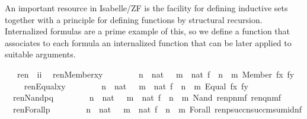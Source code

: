 An important resource in Isabelle/ZF is the facility for defining
inductive sets \cite{paulson2000fixedpoint,paulson1995set} together
with a principle for defining functions by structural recursion.
Internalized formulas are a prime example of this, so we define
a function  that associates to each formula an internalized
function that can be later applied to suitable arguments.
\begin{isabelle}
\isamarkuptrue%
\isamarkupfalse%
\ \ \ ren\ {\isacharcolon}{\isacharcolon}\ {\isachardoublequoteopen}i{\isacharequal}{\isachargreater}i{\isachardoublequoteclose}\isanewline
{}\isamarkupfalse%
\isanewline
\ \ {\isachardoublequoteopen}ren{\isacharparenleft}Member{\isacharparenleft}x{\isacharcomma}y{\isacharparenright}{\isacharparenright}\ {\isacharequal}\isanewline
\ \ \ \ \ \ {\isacharparenleft}{\isasymlambda}\ n\ {\isasymin}\ nat\ {\isachardot}\ {\isasymlambda}\ m\ {\isasymin}\ nat{\isachardot}\ {\isasymlambda}f\ {\isasymin}\ n\ {\isasymrightarrow}\ m{\isachardot}\ Member\ {\isacharparenleft}f{\isacharbackquote}x{\isacharcomma}\ f{\isacharbackquote}y{\isacharparenright}{\isacharparenright}{\isachardoublequoteclose}\isanewline
\ \ \isanewline
\ \ {\isachardoublequoteopen}ren{\isacharparenleft}Equal{\isacharparenleft}x{\isacharcomma}y{\isacharparenright}{\isacharparenright}\ {\isacharequal}\isanewline
\ \ \ \ \ \ {\isacharparenleft}{\isasymlambda}\ n\ {\isasymin}\ nat\ {\isachardot}\ {\isasymlambda}\ m\ {\isasymin}\ nat{\isachardot}\ {\isasymlambda}f\ {\isasymin}\ n\ {\isasymrightarrow}\ m{\isachardot}\ Equal\ {\isacharparenleft}f{\isacharbackquote}x{\isacharcomma}\ f{\isacharbackquote}y{\isacharparenright}{\isacharparenright}{\isachardoublequoteclose}\isanewline
\ \ \isanewline
\ \ {\isachardoublequoteopen}ren{\isacharparenleft}Nand{\isacharparenleft}p{\isacharcomma}q{\isacharparenright}{\isacharparenright}\ {\isacharequal}\isanewline
\ \ \ \ \ \ {\isacharparenleft}{\isasymlambda}\ n\ {\isasymin}\ nat\ {\isachardot}\ {\isasymlambda}\ m\ {\isasymin}\ nat{\isachardot}\ {\isasymlambda}f\ {\isasymin}\ n\ {\isasymrightarrow}\ m{\isachardot}\ Nand\ {\isacharparenleft}ren{\isacharparenleft}p{\isacharparenright}{\isacharbackquote}n{\isacharbackquote}m{\isacharbackquote}f{\isacharcomma}\ ren{\isacharparenleft}q{\isacharparenright}{\isacharbackquote}n{\isacharbackquote}m{\isacharbackquote}f{\isacharparenright}{\isacharparenright}{\isachardoublequoteclose}\isanewline
\ \ \isanewline
\ \ {\isachardoublequoteopen}ren{\isacharparenleft}Forall{\isacharparenleft}p{\isacharparenright}{\isacharparenright}\ {\isacharequal}\isanewline
\ \ \ \ \ \ {\isacharparenleft}{\isasymlambda}\ n\ {\isasymin}\ nat\ {\isachardot}\ {\isasymlambda}\ m\ {\isasymin}\ nat{\isachardot}\ {\isasymlambda}f\ {\isasymin}\ n\ {\isasymrightarrow}\ m{\isachardot}\ Forall\ {\isacharparenleft}ren{\isacharparenleft}p{\isacharparenright}{\isacharbackquote}succ{\isacharparenleft}n{\isacharparenright}{\isacharbackquote}succ{\isacharparenleft}m{\isacharparenright}{\isacharbackquote}sum{\isacharunderscore}id{\isacharparenleft}n{\isacharcomma}f{\isacharparenright}{\isacharparenright}{\isacharparenright}{\isachardoublequoteclose}
\end{isabelle}


